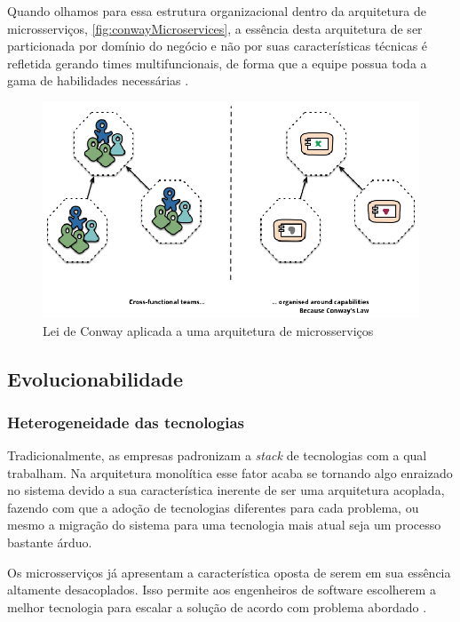 Quando olhamos para essa estrutura organizacional dentro da arquitetura de microsserviços,
\autoref{fig:conwayMicroservices}, a essência desta arquitetura de ser particionada por domínio
do negócio e não por suas características técnicas é refletida gerando times multifuncionais, de
forma que a equipe possua toda a gama de habilidades necessárias \cite{MartinFowler:Microservices}.

\begin{figure}[h]
  \centering
  \includegraphics[keepaspectratio=true,scale=1]{figuras/conwayMicroservices.eps}
  \caption{Lei de Conway aplicada a uma arquitetura de microsserviços\label{fig:conwayMicroservices} }
\end{figure}

\subsection{Evolucionabilidade}

\subsubsection{Heterogeneidade das tecnologias}
\label{pers:heterogeneidade}

Tradicionalmente, as empresas padronizam a \textit{stack} de tecnologias com a qual trabalham. Na
arquitetura monolítica esse fator acaba se tornando algo enraizado no sistema devido a sua
característica inerente de ser uma arquitetura acoplada, fazendo com que a adoção de tecnologias
diferentes para cada problema, ou mesmo a migração do sistema para uma tecnologia mais atual seja um
processo bastante árduo.

Os microsserviços já apresentam a característica oposta de serem em sua essência altamente
desacoplados. Isso permite aos engenheiros de software escolherem a melhor tecnologia para escalar a
solução de acordo com problema abordado \cite{Richards2020:FundamentalsOfSoftwareArchitecture}.

